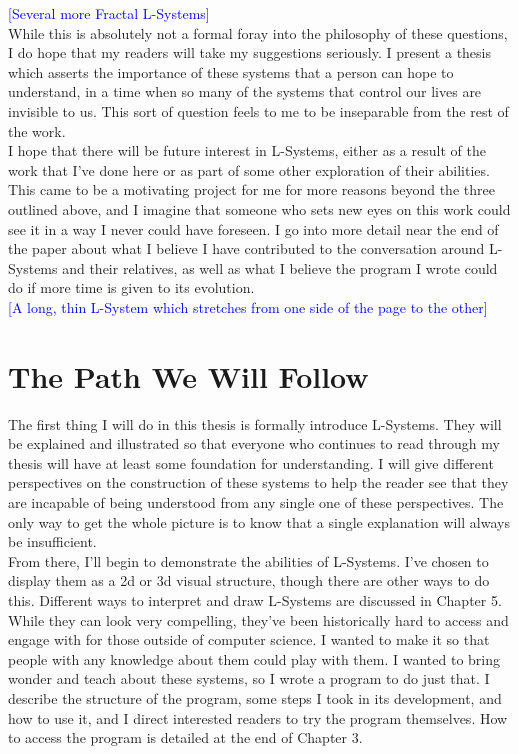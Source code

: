 \documentclass[12pt,twoside]{reedthesis}
\begin{document}
	\textcolor{blue}{[Several more Fractal L-Systems]}\\
	
	While this is absolutely not a formal foray into the philosophy of these questions, I do hope that my readers will take my suggestions seriously. I present a thesis which asserts the importance of these systems that a person can hope to understand, in a time when so many of the systems that control our lives are invisible to us. This sort of question feels to me to be inseparable from the rest of the work.\\
	
	
	I hope that there will be future interest in L-Systems, either as a result of the work that I’ve done here or as part of some other exploration of their abilities. This came to be a motivating project for me for more reasons beyond the three outlined above, and I imagine that someone who sets new eyes on this work could see it in a way I never could have foreseen. I go into more detail near the end of the paper about what I believe I have contributed to the conversation around L-Systems and their relatives, as well as what I believe the program I wrote could do if more time is given to its evolution.\\
	
	\textcolor{blue}{[A long, thin L-System which stretches from one side of the page to the other]}\\
	
\section{The Path We Will Follow}

	The first thing I will do in this thesis is formally introduce L-Systems. They will be explained and illustrated so that everyone who continues to read through my thesis will have at least some foundation for understanding. I will give different perspectives on the construction of these systems to help the reader see that they are incapable of being understood from any single one of these perspectives. The only way to get the whole picture is to know that a single explanation will always be insufficient.\\
	
	From there, I'll begin to demonstrate the abilities of L-Systems. I've chosen to display them as a 2d or 3d visual structure, though there are other ways to do this. Different ways to interpret and draw L-Systems are discussed in Chapter 5. While they can look very compelling, they've been historically hard to access and engage with for those outside of computer science. I wanted to make it so that people with any knowledge about them could play with them. I wanted to bring wonder and teach about these systems, so I wrote a program to do just that. I describe the structure of the program, some steps I took in its development, and how to use it, and I direct interested readers to try the program themselves. How to access the program is detailed at the end of Chapter 3.\\
	
\end{document}
